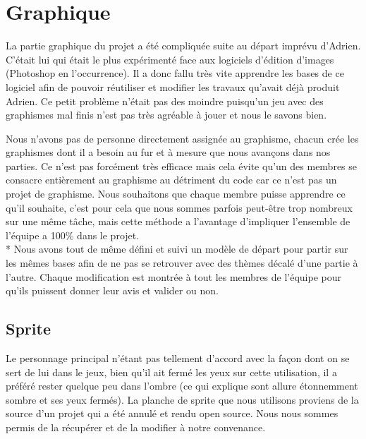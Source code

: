 \documentclass [11pt]{report}
\begin{document}
	\vspace{10mm}
	
	\newpage
	
	\section{Graphique}
	La partie graphique du projet a été compliquée suite au départ imprévu d'Adrien. C'était lui qui était le plus expérimenté face aux logiciels d'édition d'images (Photoshop en l'occurrence). Il a donc fallu  très vite apprendre les bases de ce logiciel afin de pouvoir réutiliser et modifier les travaux qu'avait déjà produit Adrien. Ce petit problème n'était pas des moindre puisqu'un jeu avec des graphismes mal finis n'est pas très agréable à jouer et nous le savons bien.
	
	\indent Nous n'avons pas de personne directement assignée au graphisme, chacun crée les graphismes dont il a besoin au fur et à mesure que nous avançons dans nos parties. Ce n'est pas forcément très efficace mais cela évite qu'un des membres se consacre entièrement au graphisme au détriment du code car ce n'est pas un projet de graphisme. Nous souhaitons que chaque membre puisse apprendre ce qu'il souhaite, c'est pour cela que nous sommes parfois peut-être trop nombreux sur une même tâche, mais cette méthode a l'avantage d'impliquer l'ensemble de l'équipe a 100\% dans le projet.\\*
	\indent Nous avons tout de même défini et suivi un modèle de départ pour partir sur les mêmes bases afin de ne pas se retrouver avec des thèmes décalé d'une partie à l'autre. Chaque modification est montrée à tout les membres de l'équipe pour qu'ils puissent donner leur avis et valider ou non.
	
	\vspace{15mm}
	
	\subsection {Sprite}
	Le personnage principal n'étant pas tellement d'accord avec la façon dont on se sert de lui dans le jeux, bien qu'il ait fermé les yeux sur cette utilisation, il a préféré rester quelque peu dans l'ombre (ce qui explique sont allure étonnemment sombre et ses yeux fermés).
	La planche de sprite que nous utilisons proviens de la source d'un projet qui a été annulé et rendu open source. Nous nous sommes permis de la récupérer et de la modifier à notre convenance.
	
\end{document}
